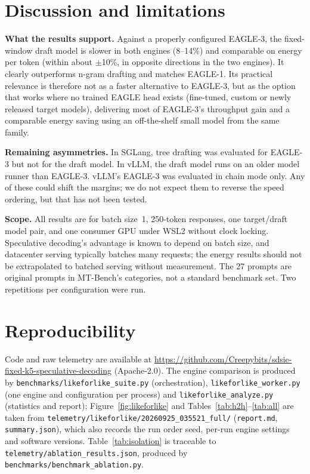 \documentclass[conference]{IEEEtran}
\begin{document}
\section{Discussion and limitations}

\textbf{What the results support.} Against a properly configured EAGLE-3,
the fixed-window draft model is slower in both engines (8--14\%) and
comparable on energy per token (within about $\pm$10\%, in opposite
directions in the two engines). It clearly outperforms n-gram drafting and
matches EAGLE-1. Its practical relevance is therefore not as a faster
alternative to EAGLE-3, but as the option that works where no trained
EAGLE head exists (fine-tuned, custom or newly released target models),
delivering most of EAGLE-3's throughput gain and a comparable energy saving
using an off-the-shelf small model from the same family.

\textbf{Remaining asymmetries.} In SGLang, tree drafting was evaluated for
EAGLE-3 but not for the draft model. In vLLM, the draft model runs on an
older model runner than EAGLE-3. vLLM's EAGLE-3 was evaluated in chain mode
only. Any of these could shift the margins; we do not expect them to
reverse the speed ordering, but that has not been tested.

\textbf{Scope.} All results are for batch size~1, 250-token responses, one
target/draft model pair, and one consumer GPU under WSL2 without clock
locking. Speculative decoding's advantage is known to depend on batch size,
and datacenter serving typically batches many requests; the energy results
should not be extrapolated to batched serving without measurement. The 27
prompts are original prompts in MT-Bench's categories, not a standard
benchmark set. Two repetitions per configuration were run.

\section{Reproducibility}
\label{sec:repro}

Code and raw telemetry are available at
\url{https://github.com/Creepybits/sdsie-fixed-k5-speculative-decoding}
(Apache-2.0). The engine comparison is produced by
\texttt{benchmarks/likeforlike\_suite.py} (orchestration),
\texttt{likeforlike\_worker.py} (one engine and configuration per process)
and \texttt{likeforlike\_analyze.py} (statistics and report);
Figure~\ref{fig:likeforlike} and Tables~\ref{tab:h2h}--\ref{tab:all} are
taken from \texttt{telemetry/likeforlike/20260925\_035521\_full/}
(\texttt{report.md}, \texttt{summary.json}), which also records the run
order seed, per-run engine settings and software versions.
Table~\ref{tab:isolation} is traceable to
\texttt{telemetry/ablation\_results.json}, produced by
\texttt{benchmarks/benchmark\_ablation.py}.
\end{document}

